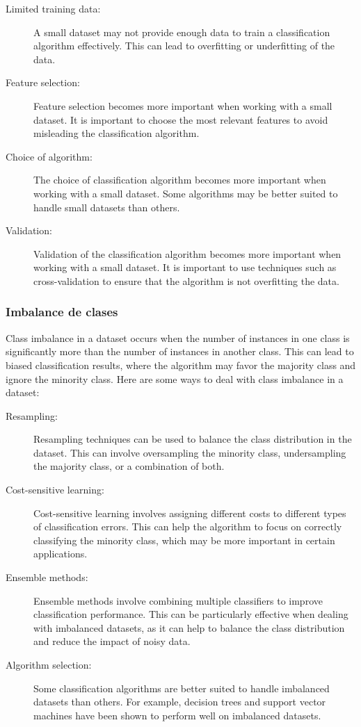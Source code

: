 \documentclass[12pt,a4paper, brazil]{article}
\begin{document}
    
\begin{description}
  \item[Limited training data:] A small dataset may not provide enough data to train a classification algorithm effectively. This can lead to overfitting or underfitting of the data.
  
  \item[Feature selection:] Feature selection becomes more important when working with a small dataset. It is important to choose the most relevant features to avoid misleading the classification algorithm.
  
  \item[Choice of algorithm:] The choice of classification algorithm becomes more important when working with a small dataset. Some algorithms may be better suited to handle small datasets than others.
  
  \item[Validation:] Validation of the classification algorithm becomes more important when working with a small dataset. It is important to use techniques such as cross-validation to ensure that the algorithm is not overfitting the data.
\end{description}

        \subsubsection{Imbalance de clases}
        Class imbalance in a dataset occurs when the number of instances in one class is significantly more than the number of instances in another class. This can lead to biased classification results, where the algorithm may favor the majority class and ignore the minority class. Here are some ways to deal with class imbalance in a dataset:

    \begin{description}
  \item[Resampling:] Resampling techniques can be used to balance the class distribution in the dataset. This can involve oversampling the minority class, undersampling the majority class, or a combination of both.
  
  \item[Cost-sensitive learning:] Cost-sensitive learning involves assigning different costs to different types of classification errors. This can help the algorithm to focus on correctly classifying the minority class, which may be more important in certain applications.
  
  \item[Ensemble methods:] Ensemble methods involve combining multiple classifiers to improve classification performance. This can be particularly effective when dealing with imbalanced datasets, as it can help to balance the class distribution and reduce the impact of noisy data.
  
  \item[Algorithm selection:] Some classification algorithms are better suited to handle imbalanced datasets than others. For example, decision trees and support vector machines have been shown to perform well on imbalanced datasets.
\end{description}
\end{document}
